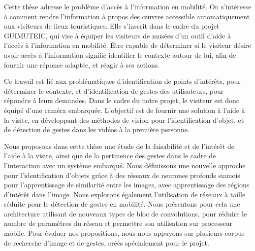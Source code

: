 \justify
Cette thèse adresse le problème d'accès à l'information en mobilité.
On s'intéresse à comment rendre l'information à propos des œuvres accessible automatiquement aux visiteurs de lieux touristiques.
Elle s'inscrit dans le cadre du projet GUIMUTEIC, qui vise à équiper les visiteurs de musées d'un outil d'aide à l'accès à l'information en mobilité.
Être capable de déterminer si le visiteur désire avoir accès à l'information signifie identifier le contexte autour de lui, afin de fournir une réponse adaptée, et réagir à ses actions.

Ce travail est lié aux problématiques d'identification de points d'intérêts, pour déterminer le contexte, et d'identification de gestes des utilisateurs, pour répondre à leurs demandes. 
Dans le cadre du notre projet, le visiteur est donc équipé d'une caméra embarquée.
L'objectif est de fournir une solution à l'aide à la visite, en développant des méthodes de vision pour l'identification d'objet, et de détection de gestes dans les vidéos à la première personne. 

Nous proposons dans cette thèse une étude de la faisabilité et de l'intérêt de l'aide à la visite, ainsi que de la pertinence des gestes dans le cadre de l'interaction avec un système embarqué. 
Nous définissons une nouvelle approche pour l'identification d'objets grâce à des réseaux de neurones profonds siamois pour l'apprentissage de similarité entre les images, avec apprentissage des régions d'intérêt dans l'image. 
Nous explorons également l'utilisation de réseaux à taille réduite pour le détection de gestes en mobilité. 
Nous présentons pour cela une architecture utilisant de nouveaux types de bloc de convolutions, pour réduire le nombre de paramètres du réseau et permettre son utilisation sur processeur mobile. 
Pour évaluer nos propositions, nous nous appuyons sur plusieurs corpus de recherche d'image et de gestes, créés spécialement pour le projet.

